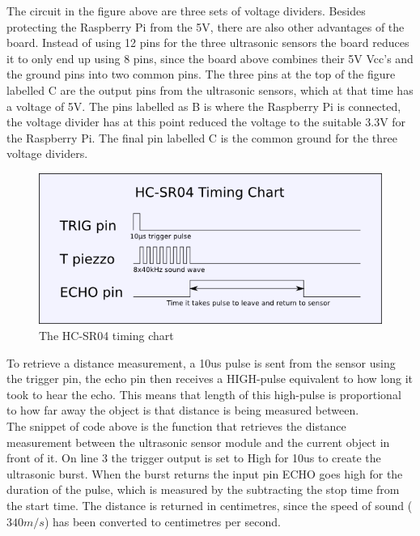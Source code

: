 The circuit in the figure above are three sets of voltage dividers. Besides protecting the Raspberry Pi from the 5V, there are also other advantages of the board. Instead of using 12 pins for the three ultrasonic sensors the board reduces it to only end up using 8 pins, since the board above combines their 5V Vcc's and the ground pins into two common pins.  
The three pins at the top of the figure labelled C are the output pins from the ultrasonic sensors, which at that time has a voltage of 5V. The pins labelled as B is where the Raspberry Pi is connected, the voltage divider has at this point reduced the voltage to the suitable 3.3V for the Raspberry Pi.  
The final pin labelled C is the common ground for the three voltage dividers.

\begin{figure}[H]
	\centering
	\includegraphics[width=.5\linewidth]{images/hcsr04timingchart.png}
	\caption{The HC-SR04 timing chart\cite{hcsr04timingchart}}
\end{figure}

To retrieve a distance measurement, a 10us pulse is sent from the sensor using the trigger pin, the echo pin then receives a HIGH-pulse equivalent to how long it took to hear the echo. This means that length of this high-pulse is proportional to how far away the object is that distance is being measured between.\cite{ultrasonichowitworks}\\




The snippet of code above is the function that retrieves the distance measurement between the ultrasonic sensor module and the current object in front of it.
On line 3 the trigger output is set to High for 10us to create the ultrasonic burst. When the burst returns the input pin ECHO goes high for the duration of the pulse, which is measured by the subtracting the stop time from the start time.
The distance is returned in centimetres, since the speed of sound ($340m/s$) has been converted to centimetres per second.